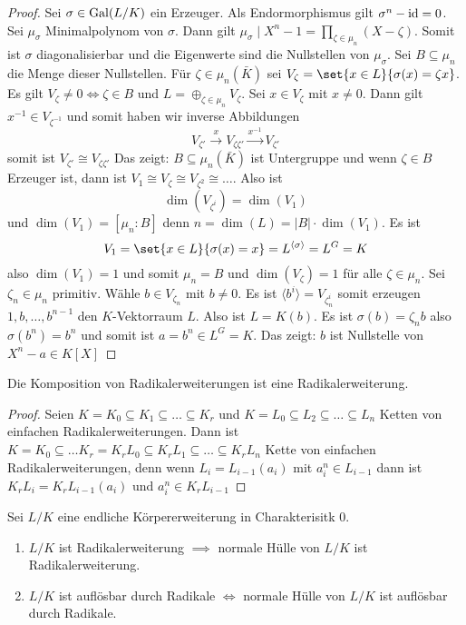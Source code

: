\begin{proof}
    Sei $\sigma\in\operatorname{Gal}(L/K)$ ein Erzeuger. Als Endormorphismus gilt $\sigma^n-\mathrm{id}=0$. Sei $\mu_\sigma$ Minimalpolynom von $\sigma$.
    Dann gilt $\mu_\sigma\mid X^n-1=\prod_{\zeta\in\mu_n}(X-\zeta)$. Somit ist $\sigma$ diagonalisierbar und die Eigenwerte sind die Nullstellen von $\mu_\sigma$. Sei $B\subseteq \mu_n$ die Menge dieser Nullstellen. Für $\zeta\in \mu_n(\bar K)$ sei $V_\zeta=\set{x\in L}{ \sigma(x)=\zeta x}$. Es gilt $V_\zeta\neq 0\iff \zeta\in B$ und
    $L=\oplus_{\zeta\in\mu_n}V_\zeta$.
    Sei $x\in V_\zeta$ mit $x\neq 0$. Dann gilt $x^{-1}\in V_{\zeta^{-1}}$ und somit haben wir inverse Abbildungen 
    $$V_{\zeta'}\stackrel{x}\to V_{\zeta\zeta'}\stackrel{x^{-1}}\to V_{\zeta'}$$ somit ist $V_{\zeta'}\cong V_{\zeta\zeta'}$
    Das zeigt: $B\subseteq \mu_n(\bar K)$ ist Untergruppe und wenn $\zeta\in B$ Erzeuger ist, dann  ist $V_1\cong V_\zeta\cong V_{\zeta^2}\cong\dots$.
    Also ist $$\dim(V_{\zeta^i})=\dim(V_1)$$ und $\dim(V_1)=[\mu_n:B]$ denn $n=\dim(L)=|B|\cdot \dim(V_1)$.
    Es ist 
    $$V_1=\set{x\in L}{ \sigma(x)=x}=L^{\langle \sigma\rangle}=L^G=K$$ also $\dim(V_1)=1$ und somit $\mu_n=B$ und $\dim(V_\zeta)=1$ für alle $\zeta\in\mu_n$.
    Sei $\zeta_n\in\mu_n$ primitiv. Wähle $b\in V_{\zeta_n}$ mit $b\neq 0$. Es ist $\langle b^i\rangle=V_{\zeta_n^i}$ somit erzeugen $1,b,\dots, b^{n-1}$ den $K$-Vektorraum $L$. Also ist $L=K(b)$.
    Es ist $\sigma(b)=\zeta_nb$ also $\sigma(b^n)=b^n$ und somit ist $a=b^n\in L^G=K$. Das zeigt: $b$ ist Nullstelle von $X^n-a\in K[X]$
\end{proof}
\begin{Lemma}
    Die Komposition von Radikalerweiterungen ist eine Radikalerweiterung.
\end{Lemma}\label{Lem:KompRad}
\begin{proof}
    Seien $K=K_0\subseteq K_1\subseteq \dots \subseteq K_r$ und $K=L_0\subseteq L_2\subseteq \dots \subseteq L_n$ Ketten von einfachen Radikalerweiterungen.
    Dann ist $K=K_0\subseteq \dots K_r=K_rL_0\subseteq K_rL_1\subseteq\dots \subseteq K_rL_n$ Kette von einfachen Radikalerweiterungen, denn wenn $L_i=L_{i-1}(a_i)$ mit $a_i^n\in L_{i-1}$ dann ist $K_rL_i=K_rL_{i-1}(a_i)$ und $a_i^n\in K_rL_{i-1}$
\end{proof}
\begin{Lemma}\label{Lem:AuflRad}
    Sei $L/K$ eine endliche Körpererweiterung in Charakterisitk $0$.
    \begin{enumerate}
        \item $L/K$ ist Radikalerweiterung $\implies $ normale Hülle von $L/K$ ist Radikalerweiterung.
        \item $L/K$ ist auflösbar durch Radikale $\iff$ normale Hülle von $L/K$ ist auflösbar durch Radikale.
    \end{enumerate}
\end{Lemma}
